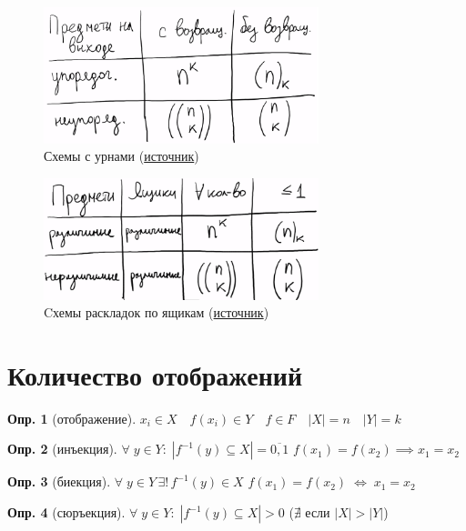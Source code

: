 \documentclass[a4paper,12pt]{article}
\numberwithin{figure}{section}
\theoremstyle{definition}
\newtheorem{definition}{Опр.}[section]
\theoremstyle{definition}
\def\iiff{$\;\Longleftrightarrow\;$}
\begin{document}
\begin{figure}[H]
	\centering
	\includegraphics[width=8cm]{schemi-urni.png}
	\caption{Схемы с урнами (\href{https://stepik.org/lesson/9483/step/2}{источник})}
\end{figure}


\begin{figure}[H]
	\centering
	\includegraphics[width=8cm]{schemi-yashiki.png}
	\caption{Cхемы раскладок по ящикам (\href{https://stepik.org/lesson/9483/step/3}{источник})}
\end{figure}


\section{Количество отображений}

\begin{definition}[отображение]
	$x_i \in X \quad f(x_i) \in Y \quad f \in F\quad |X|=n \quad |Y|=k$
\end{definition}

\begin{definition}[инъекция]
	$\forall \; y \in Y: \; |f^{-1}(y) \subseteq X| = \overline{0,1}$
	\qquad  $f(x_1) = f(x_2) \implies x_1 = x_2$
\end{definition}

\begin{definition}[биекция]
	$\forall \; y \in Y \, \exists ! \, f^{-1}(y) \in X$
	\qquad  $f(x_1) = f(x_2) $\iiff$ x_1 = x_2$
\end{definition}

\begin{definition}[сюръекция]
	$\forall \; y \in Y: \; |f^{-1}(y) \subseteq X| > 0$
	\qquad ($\nexists$ если $|X|>|Y|$)
\end{definition}
\end{document}
